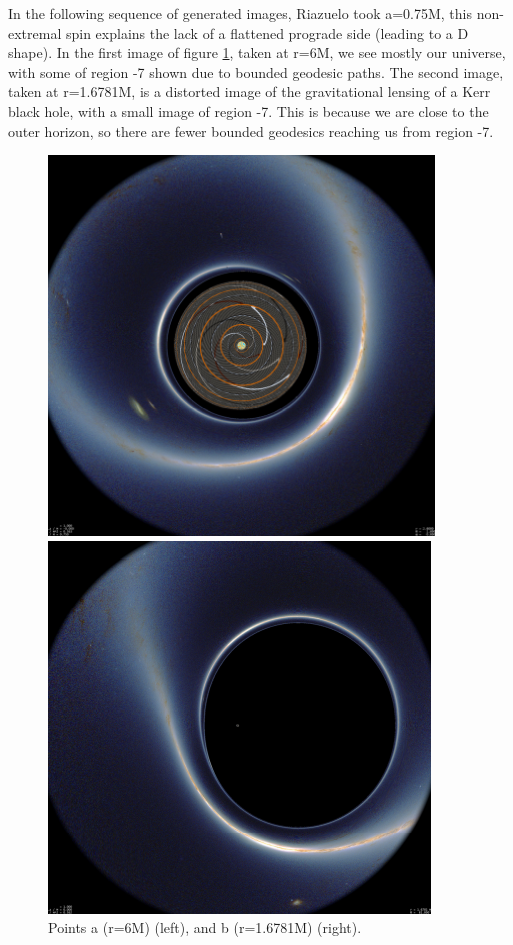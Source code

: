 \documentclass[oneside,openright,frontopenright, singlespacing]{dmathesis}
\begin{document}
\vspace{1em}
	In the following sequence of generated images, Riazuelo took a=0.75M, this non-extremal spin explains the lack of a flattened prograde side (leading to a D shape). In the first image of figure \ref{fig:Figure6.4}, taken at r=6M, we see mostly our universe, with some of region -7 shown due to bounded geodesic paths. The second image, taken at r=1.6781M, is a distorted image of the gravitational lensing of a Kerr black hole, with a small image of region -7. This is because we are close to the outer horizon, so there are fewer bounded geodesics reaching us from region -7. 

\begin{figure}[!ht]
	\centering
	\begin{minipage}{0.5\textwidth}
		\centering
		\includegraphics[width=0.75\linewidth]{img/plunging1}
	\end{minipage}%
	\hfill
	\begin{minipage}{0.5\textwidth}
		\centering
		\includegraphics[width=0.75\linewidth]{img/plunging2}
	\end{minipage}
	\caption{Points a (r=6M) (left), and b (r=1.6781M) (right).}
	\label{fig:Figure6.4}
\end{figure}
\end{document}
